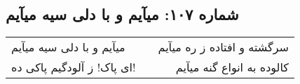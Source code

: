 \begin{center}
\section*{شماره ۱۰۷: میآیم و با دلی سیه میآیم}
\label{sec:107}
\begin{longtable}{l p{0.5cm} r}
میآیم و با دلی سیه میآیم
&&
سرگشته و افتاده ز ره میآیم
\\
ای پاک! ز آلودگیم پاکی ده!
&&
کالوده به انواع گنه میآیم
\\
\end{longtable}
\end{center}
